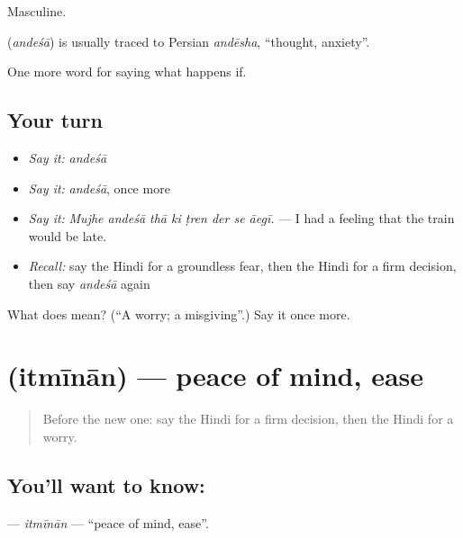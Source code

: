 Masculine.

\begin{cousinweb}
\textbf{} (\emph{andeśā}) is usually traced to Persian \emph{andēsha}, \textquotedblleft{}thought, anxiety\textquotedblright{}.
\end{cousinweb}

\begin{grammarlens}[title={What you've built}]
One more word for saying what happens if.
\end{grammarlens}

\subsection*{Your turn}
\begin{itemize}
\raggedright
  \item \emph{Say it:} \emph{andeśā}
  \item \emph{Say it:} \emph{andeśā}, once more
  \item \emph{Say it:} \emph{Mujhe andeśā thā ki ṭren der se āegī.} — I had a feeling that the train would be late.
  \item \emph{Recall:} say the Hindi for a groundless fear, then the Hindi for a firm decision, then say \emph{andeśā} again
\end{itemize}

\begin{tcolorbox}[breakable,colback=teal!4,colframe=teal!35!black,title={Before you move on}]
What does  mean? (\textquotedblleft{}A worry; a misgiving\textquotedblright{}.) Say it once more.
\end{tcolorbox}
\section[\texorpdfstring{\hi{इत्मीनान} (itmīnān)}{इत्मीनान (itmīnān)}]{ (itmīnān) — peace of mind, ease}

\label{lesson:HI-C557-itminan}



\begin{quote}
Before the new one: say the Hindi for a firm decision, then the Hindi for a worry.
\end{quote}

\subsection*{You'll want to know: }
\textbf{} — \emph{itmīnān} — \textquotedblleft{}peace of mind, ease\textquotedblright{}.

